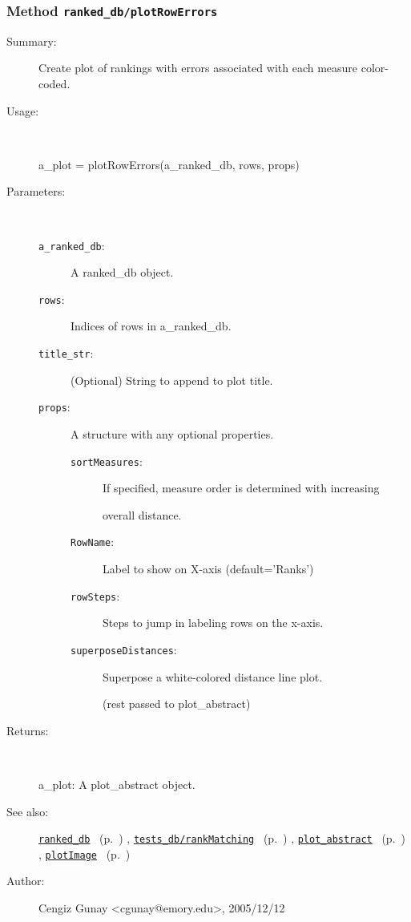 \subsubsection[Method \texttt{plotRowErrors}]{Method \texttt{ranked\_db/plotRowErrors}}%
%
\label{ref_ranked_db__plotRowErrors}%
\hypertarget{ref_ranked_db__plotRowErrors}{}%
\begin{description}
\item[Summary:]Create plot of rankings with errors associated with each measure color-coded.
%
\item[Usage:]~%
\begin{lyxcode}%
a\_plot = plotRowErrors(a\_ranked\_db, rows, props)
%
\end{lyxcode}%
%
%
\item[Parameters:]~
\begin{description}%
\item[\texttt{a\_ranked\_db}:]
 A ranked\_db object.
\item[\texttt{rows}:]
 Indices of rows in a\_ranked\_db.
\item[\texttt{title\_str}:]
 (Optional) String to append to plot title.
\item[\texttt{props}:]
 A structure with any optional properties.
\begin{description}%
\item[\texttt{sortMeasures}:]
 If specified, measure order is determined with increasing 

overall distance.\item[\texttt{RowName}:]
 Label to show on X-axis (default='Ranks')
\item[\texttt{rowSteps}:]
 Steps to jump in labeling rows on the x-axis.
\item[\texttt{superposeDistances}:]
 Superpose a white-colored distance line plot.

(rest passed to plot\_abstract)\end{description}%
\end{description}%
%
\item[Returns:]~

	a\_plot: A plot\_abstract object.
%
%
\item[See also:]%
\hyperlink{ref_ranked_db}{\texttt{ranked\_db}}%
\ (p.~\pageref{ref_ranked_db})%
%
, \hyperlink{ref_tests_db__rankMatching}{\texttt{tests\_db/rankMatching}}%
\ (p.~\pageref{ref_tests_db__rankMatching})%
%
, \hyperlink{ref_plot_abstract}{\texttt{plot\_abstract}}%
\ (p.~\pageref{ref_plot_abstract})%
%
, \hyperlink{ref_plotImage}{\texttt{plotImage}}%
\ (p.~\pageref{ref_plotImage})%
%
%
\item[Author:]%
Cengiz Gunay <cgunay@emory.edu>, 2005/12/12%
\end{description}
\methodline%
